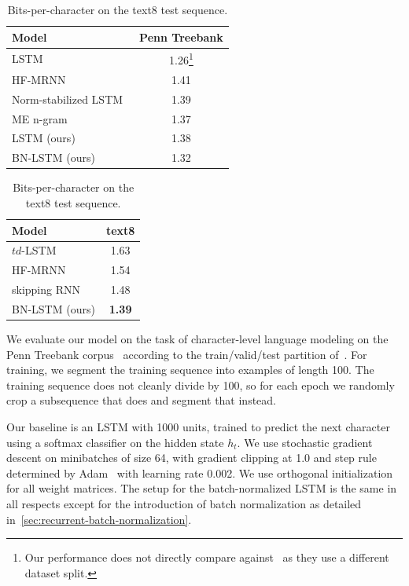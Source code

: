 \documentclass{article} %
\begin{document}
\begin{table}
  \center
\begin{minipage}[t]{6.5cm}
\begin{tabular}{@{}lc@{}}
  \toprule
  \bf Model & \bf Penn Treebank \\
  \midrule
  LSTM~\cite{graves2013generating} &  1.26\footnote{Our performance does not directly compare against~\cite{graves2013generating} as they use a different dataset split.}\\
  \midrule
  HF-MRNN~\cite{mikolov2012subword} & 1.41 \\
  Norm-stabilized LSTM~\cite{krueger} & 1.39 \\
  ME n-gram~\cite{mikolov2012subword} & 1.37 \\
  \midrule
  LSTM (ours) & 1.38 \\
  BN-LSTM (ours) & 1.32 \\
  \bottomrule
\end{tabular}
\caption{Bits-per-character on the Penn Treebank test sequence.}
\label{tab:ptb_test}
\end{minipage}
\hspace{1cm}
\begin{minipage}[t]{4.5cm}
  \begin{tabular}{@{}lc@{}}
  \toprule
  \bf Model & \bf text8 \\
  \midrule
  $td$-LSTM~\cite{zhang2016architectural} & 1.63 \\
  HF-MRNN~\cite{mikolov2012subword} & 1.54 \\
  skipping RNN~\cite{pachitariu2013regularization} & 1.48 \\
  \midrule
  BN-LSTM (ours) & \textbf{1.39} \\
  \bottomrule
\end{tabular}
\caption{Bits-per-character on the text8 test sequence.}
\label{tab:text8_test}
\end{minipage}
\end{table}


We evaluate our model on the task of character-level language modeling on the Penn Treebank corpus~\cite{penntreebank}
according to the train/valid/test partition of~\cite{mikolov2012subword}.
For training, we segment the training sequence into examples of length 100.
The training sequence does not cleanly divide by 100, so for each epoch we randomly crop a subsequence that does and segment that instead.

Our baseline is an LSTM with 1000 units, trained to predict the next character using a softmax classifier on the hidden state $h_t$.
We use stochastic gradient descent on minibatches of size 64,
with gradient clipping at 1.0 and step rule determined by Adam~\cite{kingma2014adam}
with learning rate 0.002.
We use orthogonal initialization for all weight matrices.
The setup for the batch-normalized LSTM is the same in all respects except for the introduction of batch normalization as detailed in~\ref{sec:recurrent-batch-normalization}.
\end{document}
